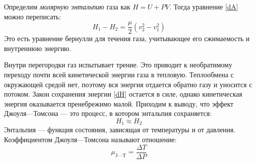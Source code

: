 \documentclass[a4paper,12pt]{report}
\begin{document}
        Определим \emph{молярную энтальпию} газа как $H=U+PV$. Тогда уравнение \eqref{dA} можно переписать:
        \begin{equation}
            H_1-H_2=\frac{\mu}{2}(v_2^2-v_1^2)
            \label{dH}
        \end{equation}
        Это есть уравнение бернулли для течения газа, учитывающее его сжимаемость и внутреннюю энергию.
        
        Внутри перегородки газ испытывает трение. Это приводит к необратимому переходу почти всей кинетической энергии газа в тепловую. Теплообмена с окружающей средой нет, поэтому вся энергия отдается обратно газу и уносится с потоком. Закон сохранения энергии \eqref{dH} остается в силе, однако кинетическая энергия оказывается пренебрежимо малой. Приходим к выводу, что эффект Джоуля---Томсона --- это процесс, в котором энтальпия сохраняется:
        \begin{equation}
            \label{H1=H2}
            H_1\approx H_2
        \end{equation}
        Энтальпия --- функция состояния, зависящая от температуры и от давления. Коэффициентом Джоуля---Томсона называют отношение:
        \begin{equation}
            \label{coefD-T}
            \mu_{\text{J---T}}=\frac{\Delta T}{\Delta P}
        \end{equation}
\end{document}
